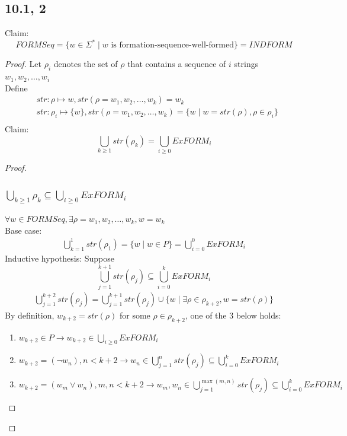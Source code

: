 \documentclass{article}
\begin{document}
\subsection*{10.1, 2}
Claim: \[FORMSeq = \{w \in \Sigma^* \mid w \text{ is formation-sequence-well-formed}\} = INDFORM\]
\begin{proof}
    Let $\rho_i$ denotes the set of $\rho$ that contains a sequence of $i$ strings $w_1, w_2, \dots, w_i$\\
    Define 
    \begin{align*}
        &str: \rho \mapsto w, str(\rho = w_1, w_2, \dots, w_k) = w_k \\
        &str: \rho_i \mapsto \{w\}, str(\rho = w_1, w_2, \dots, w_k) = \{w \mid w = str(\rho), \rho \in \rho_i\}\\
    \end{align*}
    Claim: 
    \[\bigcup_{k \geq 1} str(\rho_k) = \bigcup_{i\geq 0} ExFORM_i\]
    \begin{proof}
        \subsubsection*{$\bigcup_{k \geq 1} \rho_k \subseteq \bigcup_{i\geq 0} ExFORM_i$}
        $\forall w \in FORMSeq, \exists \rho = w_1, w_2, \dots, w_k, w = w_k$\\
        Base case:
        \begin{align*}
            \bigcup_{k=1}^1str(\rho_1)= \{w\mid w \in P\} = \bigcup_{i=0}^0 ExFORM_i
        \end{align*}
        Inductive hypothesis: Suppose
        \[\bigcup_{j=1}^{k+1}str(\rho_j) \subseteq \bigcup_{i = 0}^k ExFORM_i\]
        \begin{align*}
            \bigcup_{j=1}^{k+2}str(\rho_j) = \bigcup_{j=1}^{k+1}str(\rho_j) \cup \{w \mid \exists \rho \in \rho_{k+2}, w = str(\rho)\}
        \end{align*}
        By definition, $w_{k+2} = str(\rho)$ for some $\rho \in \rho_{k+2}$, one of the 3 below holds:
        \begin{enumerate}
            \item $w_{k+2} \in P \rightarrow w_{k+2} \in \bigcup_{i\geq 0} ExFORM_i$
            \item $w_{k+2} = (\neg w_n), n < k+2 \rightarrow w_n \in \bigcup_{j=1}^{n}str(\rho_j) \subseteq \bigcup_{i=0}^k ExFORM_i$
            \item $w_{k+2} = (w_m \lor w_n), m, n < k + 2 \rightarrow w_m, w_n \in \bigcup_{j=1}^{\max(m, n)}str(\rho_j) \subseteq \bigcup_{i=0}^k ExFORM_i $
        \end{enumerate}

\end{proof}
\end{proof}
\end{document}
